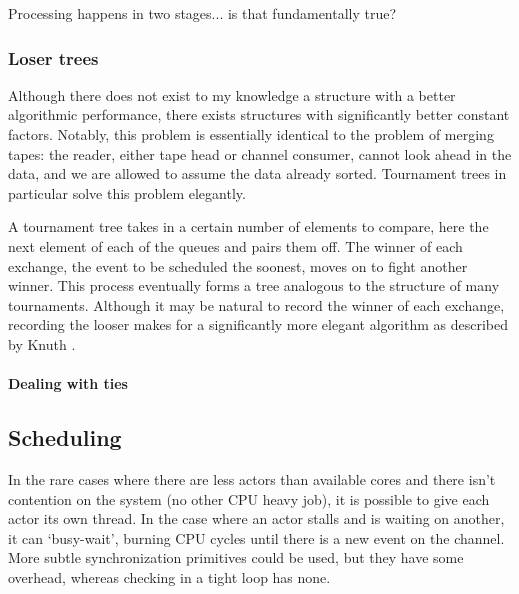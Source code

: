 Processing happens in two stages... is that fundamentally true?

\subsubsection{Loser trees}

Although there does not exist to my knowledge a structure with a better algorithmic performance, there exists structures with significantly better constant factors.
Notably, this problem is essentially identical to the problem of merging tapes: the reader, either tape head or channel consumer, cannot look ahead in the data, and we are allowed to assume the data already sorted.
Tournament trees in particular solve this problem elegantly.

A tournament tree takes in a certain number of elements to compare, here the next element of each of the queues and pairs them off.
The winner of each exchange, the event to be scheduled the soonest, moves on to fight another winner.
This process eventually forms a tree analogous to the structure of many tournaments.
Although it may be natural to record the winner of each exchange, recording the looser makes for a significantly more elegant algorithm as described by Knuth \cite{knuth_art_1998}.


\paragraph{Dealing with ties}

\subsection{Scheduling} \label{rustasim-sched}

In the rare cases where there are less actors than available cores and there isn't contention on the system (no other CPU heavy job), it is possible to give each actor its own thread.
In the case where an actor stalls and is waiting on another, it can `busy-wait', burning CPU cycles until there is a new event on the channel.
More subtle synchronization primitives could be used, but they have some overhead, whereas checking in a tight loop has none.

